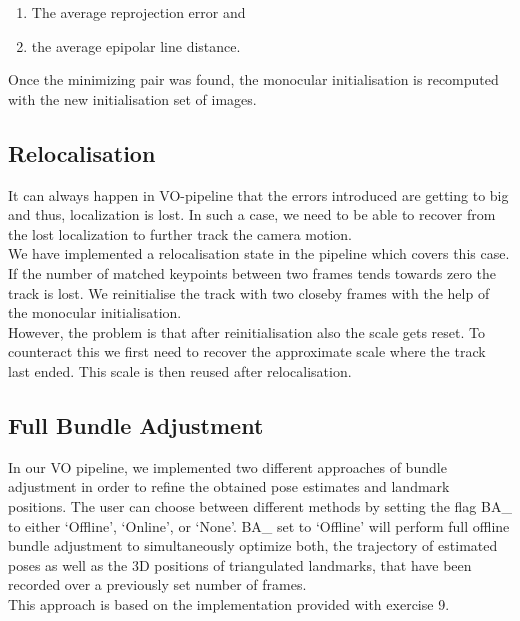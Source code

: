 \begin{enumerate}
\item The average reprojection error and 
\item the average epipolar line distance.
\end{enumerate}

Once the minimizing pair was found, the monocular initialisation is recomputed with the new initialisation set of images.

\subsection{Relocalisation}
It can always happen in VO-pipeline that the errors introduced are getting to big and thus, localization is lost. In such a case, we need to be able to recover from the lost localization to further track the camera motion. \\
We have implemented a relocalisation state in the pipeline which covers this case. If the number of matched keypoints between two frames tends towards zero the track is lost. We reinitialise the track with two closeby frames with the help of the monocular initialisation. \\
However, the problem is that after reinitialisation also the scale gets reset. To counteract this we first need to recover the approximate scale where the track last ended. This scale is then reused after relocalisation. 

\subsection{Full Bundle Adjustment}

In our VO pipeline, we implemented two different approaches of bundle adjustment in order to refine the obtained pose estimates and landmark positions. The user can choose between different methods by setting the flag BA\_ to either ‘Offline’, ‘Online’, or ‘None’. 
BA\_ set to ‘Offline’ will perform full offline bundle adjustment to simultaneously optimize both, the trajectory of estimated poses as well as the 3D positions of triangulated landmarks, that have been recorded over a previously set number of frames. \\
This approach is based on the implementation provided with exercise 9. 

